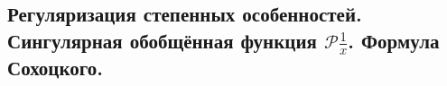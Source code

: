 \subsection{Регуляризация степенных особенностей. Сингулярная обобщённая функция $\mathcal{P} \frac{1}{x}$. Формула Сохоцкого.}